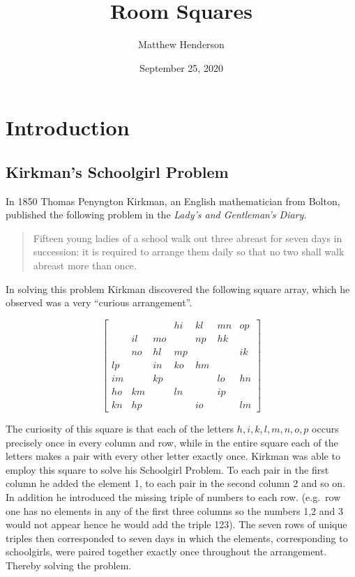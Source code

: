 \documentclass[
  11pt,
  a4paper]{book}
\title{Room Squares}
\author{Matthew Henderson}
\date{September 25, 2020}
\begin{document}
\maketitle

{
\setcounter{tocdepth}{1}
\tableofcontents
}
\hypertarget{introduction}{%
\chapter{Introduction}\label{introduction}}

\hypertarget{kirkmans-schoolgirl-problem}{%
\section{Kirkman's Schoolgirl Problem}\label{kirkmans-schoolgirl-problem}}

In 1850 Thomas Penyngton Kirkman, an English mathematician from Bolton,
published the following problem in the \emph{Lady's and Gentleman's Diary.}

\begin{quote}
Fifteen young ladies of a school walk out three abreast for seven
days in succession: it is required to arrange them daily so that no
two shall walk abreast more than once.
\end{quote}

In solving this problem Kirkman discovered the following square array,
which he observed was a very ``curious arrangement''.

\begin{equation}
  \begin{bmatrix}
       &    &    & hi & kl & mn & op \\
       & il & mo &    & np & hk &    \\
       & no & hl & mp &    &    & ik \\
    lp &    & in & ko & hm &    &    \\
    im &    & kp &    &    & lo & hn \\
    ho & km &    & ln &    & ip &    \\
    kn & hp &    &    & io &    & lm 
  \end{bmatrix}
\end{equation}

The curiosity of this square is that each of the letters
\(h, i, k, l, m, n, o, p\)
occurs precisely once in every column and row, while in the entire
square each of the letters makes a pair with every other letter exactly
once. Kirkman was able to employ this square to solve his Schoolgirl
Problem. To each pair in the first column he added the element 1, to
each pair in the second column 2 and so on. In addition he introduced
the missing triple of numbers to each row. (e.g.~row one has no elements
in any of the first three columns so the numbers 1,2 and 3 would not
appear hence he would add the triple 123). The seven rows of unique
triples then corresponded to seven days in which the elements,
corresponding to schoolgirls, were paired together exactly once
throughout the arrangement. Thereby solving the problem.
\end{document}
